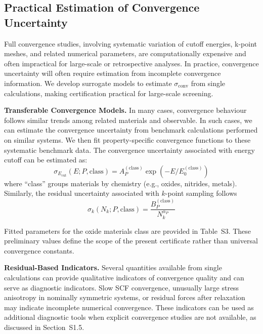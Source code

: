 \documentclass[twocolumn,superscriptaddress,amsmath,amssymb,longbibliography]{revtex4-2}
\newcommand{\Ecut}{E_{\mathrm{cut}}}
\newcommand{\conv}{\mathrm{conv}}
\newcommand{\Nk}{N_k}
\begin{document}
\subsection{Practical Estimation of Convergence Uncertainty}
\label{sec:practical}

Full convergence studies, involving systematic variation of cutoff energies, k-point meshes, and related numerical parameters, are computationally expensive and often impractical for large-scale or retrospective analyses. In practice, convergence uncertainty will often require estimation from incomplete convergence information.
We develop surrogate models to estimate
$\sigma_\conv$ from single calculations, making certification practical for
large-scale screening.

{\bf Transferable Convergence Models.}
In many cases, convergence behaviour follows similar trends among related materials and observable. In such cases, we can estimate the convergence uncertainty from benchmark calculations performed on similar systems. We then fit property-specific convergence functions to these systematic benchmark data.
The convergence uncertainty associated with energy cutoff can be estimated as\cite{Payne1992}:
\begin{equation}
    \sigma_{\Ecut}(E; P, \text{class}) = A_P^{(\text{class})}
    \exp\left(-E / E_0^{(\text{class})}\right)
    \label{eq:cutoff_model}
\end{equation}
where ``class'' groups materials by chemistry (e.g., oxides, nitrides, metals).
Similarly, the residual uncertainty associated with $k$-point sampling follows \cite{Monkhorst1976,Wisesa2016}
\begin{equation}
    \sigma_k(\Nk; P, \text{class}) = \frac{B_P^{(\text{class})}}{\Nk^{\alpha_P}}
    \label{eq:kpoint_model}
\end{equation}

Fitted parameters for the oxide materials class are provided in
Table~S3. These preliminary values define the scope of
the present certificate rather than universal convergence constants.

{\bf Residual-Based Indicators.}
Several quantities available from single calculations can provide qualitative indicators of convergence
quality and can serve as diagnostic indicators. Slow SCF convergence, unusually large stress anisotropy in nominally symmetric systems, or residual forces after relaxation may indicate incomplete numerical convergence. These indicators can be used as additional diagnostic tools when explicit convergence studies are not available, as discussed in Section~S1.5.
\end{document}
